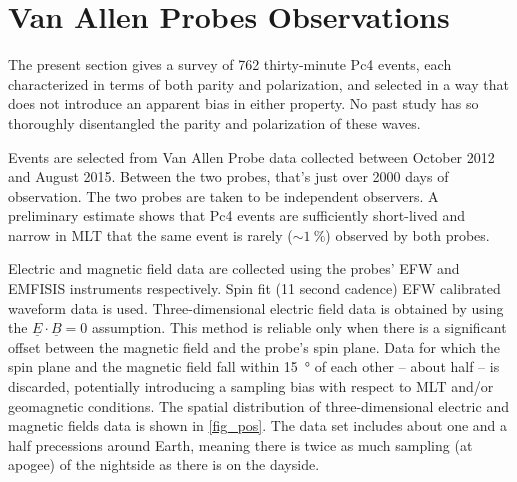 \documentclass[draft,linenumbers]{agujournal}
\begin{document}

\section{Van Allen Probes Observations}

The present section gives a survey of 762 thirty-minute Pc4 events, each characterized in terms of both parity and polarization, and selected in a way that does not introduce an apparent bias in either property. No past study has so thoroughly disentangled the parity and polarization of these waves.

Events are selected from Van Allen Probe data collected between October 2012 and August 2015. Between the two probes, that's just over 2000 days of observation. The two probes are taken to be independent observers. A preliminary estimate shows that Pc4 events are sufficiently short-lived and narrow in MLT that the same event is rarely ($\sim\SI{1}{\percent}$) observed by both probes.


Electric and magnetic field data are collected using the probes' EFW\citep{wygant_2013} and EMFISIS\citep{kletzing_2013} instruments respectively. Spin fit (11 second cadence) EFW calibrated waveform data is used. Three-dimensional electric field data is obtained by using the $\underline{E} \cdot \underline{B} = 0$ assumption. This method is reliable only when there is a significant offset between the magnetic field and the probe's spin plane. Data for which the spin plane and the magnetic field fall within \SI{15}{\degree} of each other -- about half -- is discarded, potentially introducing a sampling bias with respect to MLT and/or geomagnetic conditions. The spatial distribution of three-dimensional electric and magnetic fields data is shown in \cref{fig_pos}. The data set includes about one and a half precessions around Earth, meaning there is twice as much sampling (at apogee) of the nightside as there is on the dayside.
\end{document}

